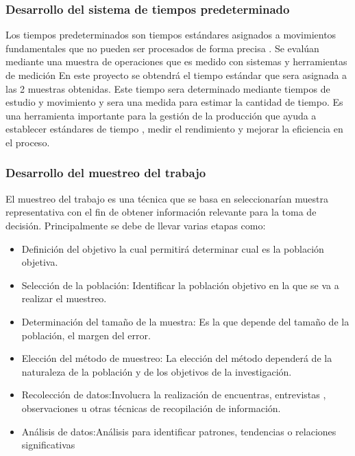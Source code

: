     \subsubsection{Desarrollo del sistema de tiempos predeterminado}
    Los tiempos predeterminados son tiempos estándares asignados a movimientos fundamentales que no pueden ser procesados de forma precisa . Se evalúan mediante una muestra de operaciones que es medido con sistemas y  herramientas de medición En este proyecto se obtendrá el tiempo estándar que sera asignada a las 2 muestras obtenidas. Este tiempo sera determinado mediante tiempos de estudio y movimiento y sera una medida para estimar la cantidad de tiempo.
    Es una herramienta importante para la gestión de la producción que ayuda a establecer estándares de tiempo , medir el rendimiento y mejorar la eficiencia en el proceso.\cite{YS} 
    \subsubsection{Desarrollo del muestreo del trabajo}
    El muestreo del trabajo es una técnica que se basa en seleccionarían muestra representativa con el fin de obtener información relevante para la toma de decisión. 
    Principalmente se debe de llevar varias etapas como:
    \begin{itemize}
        \item Definición del objetivo la cual permitirá determinar cual es la población objetiva.
        \item Selección de la población: Identificar la población objetivo en la que se va a realizar el muestreo.
        \item Determinación del tamaño de la muestra: Es la que depende del tamaño de la población, el margen del error.
        \item Elección del método de muestreo: La elección del método dependerá de la naturaleza de la población y de los objetivos de la investigación.
        \item Recolección de datos:Involucra la realización de encuentras, entrevistas , observaciones u otras técnicas de recopilación de información.
        \item Análisis de datos:Análisis para identificar patrones, tendencias o relaciones significativas
    \end{itemize}  
